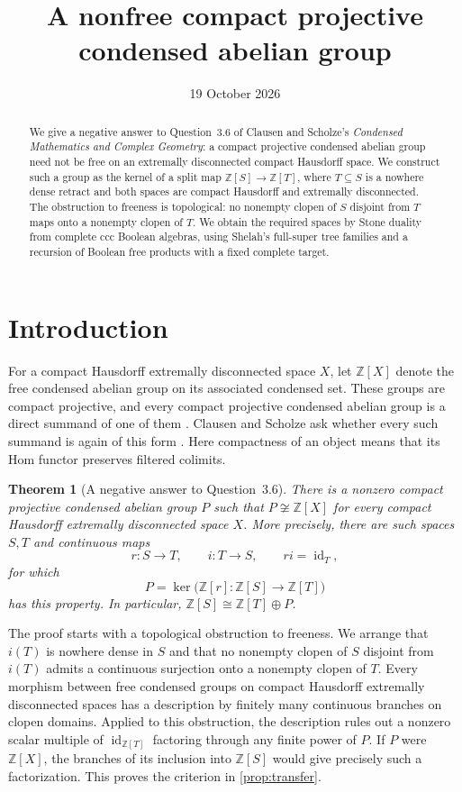 \documentclass[11pt]{article}
\title{A nonfree compact projective condensed abelian group}
\author{}
\date{19 October 2026}
\newtheorem{theorem}{Theorem}[section]
\theoremstyle{definition}
\theoremstyle{remark}
\newcommand{\Z}{\mathbb Z}
\newcommand{\id}{\operatorname{id}}
\begin{document}
\maketitle
\begin{abstract}
We give a negative answer to Question~3.6 of Clausen and Scholze's
\emph{Condensed Mathematics and Complex Geometry}: a compact projective
condensed abelian group need not be free on an extremally disconnected
compact Hausdorff space. We construct such a group as the kernel of a
split map $\Z[S]\to\Z[T]$, where $T\subseteq S$ is a nowhere dense
retract and both spaces are compact Hausdorff and extremally disconnected.
The obstruction to freeness is topological:
no nonempty clopen of $S$ disjoint from $T$ maps onto a nonempty clopen
of $T$. We obtain the required spaces by Stone duality from complete
ccc Boolean algebras, using Shelah's full-super tree families and a
recursion of Boolean free products with a fixed complete target.
\end{abstract}

\section{Introduction}
\label{sec:introduction}

For a compact Hausdorff extremally disconnected space $X$, let $\Z[X]$
denote the free condensed abelian group on its associated condensed set.
These groups are compact projective, and every compact projective
condensed abelian group is a direct summand of one of them
\cite[Proposition~3.5]{ClausenScholzeComplex}.
Clausen and Scholze ask whether every such summand is again of this
form \cite[Question~3.6]{ClausenScholzeComplex}. Here compactness of an
object means that its Hom functor preserves filtered colimits.

\begin{theorem}[A negative answer to Question~3.6]
\label{thm:main}
There is a nonzero compact projective condensed abelian group $P$ such
that $P\not\cong\Z[X]$ for every compact Hausdorff extremally disconnected
space $X$. More precisely, there are such spaces $S,T$ and continuous maps
\[
 r:S\longrightarrow T,\qquad i:T\longrightarrow S,
 \qquad r i=\id_T,
\]
for which
\[
 P=\ker\bigl(\Z[r]:\Z[S]\longrightarrow\Z[T]\bigr)
\]
has this property. In particular,
$\Z[S]\cong\Z[T]\oplus P$.
\end{theorem}

The proof starts with a topological obstruction to freeness. We arrange
that $i(T)$ is nowhere dense in $S$ and that no nonempty clopen of $S$
disjoint from $i(T)$ admits a continuous surjection onto a nonempty
clopen of $T$. Every morphism between free condensed groups on compact
Hausdorff extremally disconnected spaces has a description by finitely
many continuous branches on clopen domains.
Applied to this obstruction, the description rules out a nonzero
scalar multiple of $\id_{\Z[T]}$ factoring through any finite power
of $P$. If $P$ were $\Z[X]$, the branches of its inclusion into $\Z[S]$
would give precisely such a factorization. This proves the criterion
in \cref{prop:transfer}.
\end{document}
